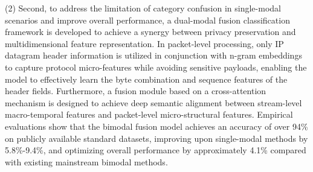 \begin{abstract*}
  (2) Second, to address the limitation of category confusion in single-modal scenarios and improve overall performance, a dual-modal fusion classification framework is developed to achieve a synergy between privacy preservation and multidimensional feature representation. In packet-level processing, only IP datagram header information is utilized in conjunction with n-gram embeddings to capture protocol micro-features while avoiding sensitive payloads, enabling the model to effectively learn the byte combination and sequence features of the header fields. Furthermore, a fusion module based on a cross-attention mechanism is designed to achieve deep semantic alignment between stream-level macro-temporal features and packet-level micro-structural features. Empirical evaluations show that the bimodal fusion model achieves an accuracy of over 94\% on publicly available standard datasets, improving upon single-modal methods by 5.8\%-9.4\%, and optimizing overall performance by approximately 4.1\% compared with existing mainstream bimodal methods.
\end{abstract*}
